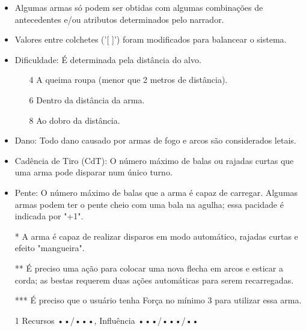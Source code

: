 \begin{itemize}[noitemsep]
\item Algumas armas só podem ser obtidas com algumas combinações de antecedentes e/ou atributos determinados pelo narrador.

\item Valores entre colchetes ('[ ]') foram modificados para balancear o sistema.

\item Dificuldade: É determinada pela distância do alvo.
\begin{itemize}[noitemsep]
  \item [4] A queima roupa (menor que 2 metros de distância).
  \item [6] Dentro da distância da arma.
  \item [8] Ao dobro da distância.
\end{itemize}

\item Dano: Todo dano causado por armas de fogo e arcos são considerados letais.

\item Cadência de Tiro (CdT): O número máximo de balas ou rajadas curtas que uma arma pode disparar num único turno.

\item Pente: O número máximo de balas que a arma é capaz de carregar. Algumas armas podem ter o pente cheio com uma bala na agulha; essa pacidade é indicada por "+1".

\item[*] A arma é capaz de realizar disparos em modo automático, rajadas curtas e efeito "mangueira".

\item[**] É preciso uma ação para colocar uma nova flecha em arcos e esticar a corda; as bestas requerem duas ações automáticas para serem recarregadas.

\item[***] É preciso que o usuário tenha Força no mínimo 3 para utilizar essa arma.

\item [1] Recursos ••/•••, Influência •••/•••/••
\end{itemize}